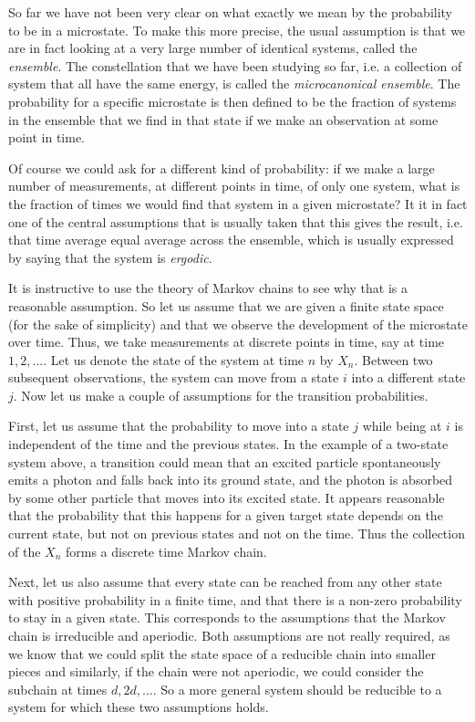 \documentclass[a4paper, draft]{article}
\theoremstyle{own}
\theoremstyle{remark}
\begin{document}
So far we have not been very clear on what exactly we mean by the probability to be in a microstate. To make this more precise, the usual assumption is that we are in fact looking at a very large number of identical systems, called the {\em ensemble}. The constellation that we have been studying so far, i.e. a collection of system that all have the same energy, is called the {\em microcanonical ensemble}. The probability for a specific microstate is then defined to be the fraction of systems in the ensemble that we find in that state if we make an observation at some point in time.

Of course we could ask for a different kind of probability: if we make a large number of measurements, at different points in time, of only one system, what is the fraction of times we would find that system in a given microstate? It it in fact one of the central assumptions that is usually taken that this gives the result, i.e. that time average equal average across the ensemble, which is usually expressed by saying that the system is {\em ergodic}. 

It is instructive to use the theory of Markov chains to see why that is a reasonable assumption. So let us assume that we are given a finite state space (for the sake of simplicity) and that we observe the development of the microstate over time. Thus, we take measurements at discrete points in time, say at time $1, 2, \dots$. Let us denote the state of the system at time $n$ by $X_n$. Between two subsequent observations, the system can move from a state $i$ into a different state $j$. Now let us make a couple of assumptions for the transition probabilities.

First, let us assume that the probability to move into a state $j$ while being at $i$ is independent of the time and the previous states. In the example of a two-state system above, a transition could mean that an excited particle spontaneously emits a photon and falls back into its ground state, and the photon is absorbed by some other particle that moves into its excited state. It appears reasonable that the probability that this happens for a given target state depends on the current state, but not on previous states and not on the time. Thus the collection of the $X_n$ forms a discrete time Markov chain. 

Next, let us also assume that every state can be reached from any other state with positive probability in a finite time, and that there is a non-zero probability to stay in a given state. This corresponds to the assumptions that the Markov chain is irreducible and aperiodic. Both assumptions are not really required, as we know that we could split the state space of a reducible chain into smaller pieces and similarly, if the chain were not aperiodic, we could consider the subchain at times $d, 2d, \dots$. So a more general system should be reducible to a system for which these two assumptions holds.
\end{document}
